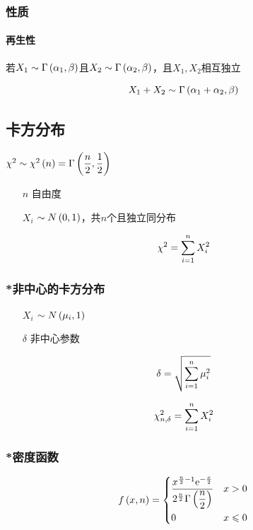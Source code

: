 \documentclass{article}
\begin{document}
\subsubsection{性质}

\paragraph{再生性}

若$X_1\sim\Gamma\left(\alpha_1,\beta\right)$且$X_2\sim\Gamma\left(\alpha_2,\beta\right)$，且$X_1,X_2$相互独立

\[X_1+X_2\sim\Gamma\left(\alpha_1+\alpha_2,\beta\right)\]

\subsection{卡方分布}

$\chi^2\sim\chi^2\left(n\right)=\Gamma\left(\dfrac n2,\dfrac12\right)$

\begin{enumerate}
    \item [$n$] 自由度
    \item [$X_i$] $\sim N\left(0,1\right)$，共$n$个且独立同分布
\end{enumerate}

\[\chi^2=\sum\limits_{i=1}^n X_i^2\]

\subsubsection{*非中心的卡方分布}

\begin{enumerate}
    \item [$X_i$] $\sim N\left(\mu_i,1\right)$
    \item [$\delta$] 非中心参数
\end{enumerate}

\[\delta=\sqrt{\sum\limits_{i=1}^n\mu_i^2}\]

\[\chi_{n,\delta}^2=\sum\limits_{i=1}^n X_i^2\]

\subsubsection{*密度函数}

\[f\left(x,n\right)=
    \left\{\begin{aligned}
         & \frac{x^{\frac n2-1}\mathrm e^{-\frac x2}}{2^{\frac n2}\Gamma\left(\dfrac n2\right)} &  & x>0         \\
         & 0                                                                    &  & x\leqslant0
    \end{aligned}\right.\]
\end{document}
